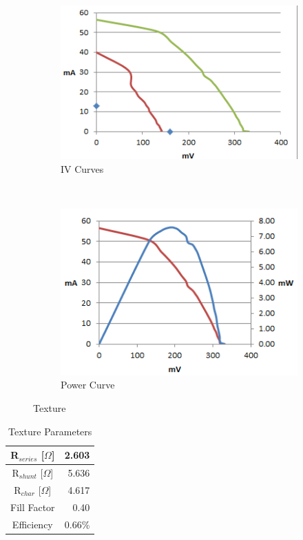 \documentclass[letter,12pt]{article}
\begin{document}
			\begin{figure}[h!]
				\centering
				\begin{subfigure}[b]{.45\textwidth}
					\includegraphics[width=\textwidth]{./Images/IV_Curves/Alt_Texture_IV.png}
					\caption{IV Curves}
				\end{subfigure}
				~
				\begin{subfigure}[b]{.45\textwidth}
					\includegraphics[width=\textwidth]{./Images/IV_Curves/Alt_Texture_PV.png}
					\caption{Power Curve}
				\end{subfigure}
				
				\caption{Texture}
				\label{fig:Alt_Texture}
			\end{figure}
			
			\begin{table}[h!]
				\centering
				\begin{tabular}{|c | r|}
					\hline
					R$_{series}$ [$\Omega$] & 2.603 \\
					\hline
					R$_{shunt}$ [$\Omega$] & 5.636 \\
					\hline
					R$_{char}$ [$\Omega$] & 4.617 \\
					\hline
					Fill Factor & 0.40 \\
					\hline
					Efficiency & 0.66\% \\
					\hline
				\end{tabular}
				\caption{Texture Parameters}
			\end{table}
		
\end{document}
